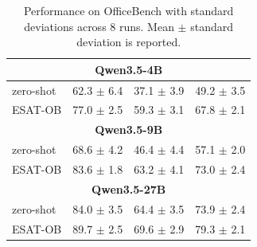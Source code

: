 \begin{table}[H]
{\begin{tabular}{lccc}
\multicolumn{4}{c}{\bf Qwen3.5-4B}\\
\midrule
zero-shot & 62.3 $\pm$ 6.4 & 37.1 $\pm$ 3.9 & 49.2 $\pm$ 3.5 \\
\textsc{ESAT-OB} & 77.0 $\pm$ 2.5 & 59.3 $\pm$ 3.1 & 67.8 $\pm$ 2.1 \\
\midrule

\multicolumn{4}{c}{\bf Qwen3.5-9B}\\
\midrule
zero-shot & 68.6 $\pm$ 4.2 & 46.4 $\pm$ 4.4 & 57.1 $\pm$ 2.0 \\
\textsc{ESAT-OB} & 83.6 $\pm$ 1.8 & 63.2 $\pm$ 4.1 & 73.0 $\pm$ 2.4 \\
\midrule

\multicolumn{4}{c}{\bf Qwen3.5-27B}\\
\midrule
zero-shot & 84.0 $\pm$ 3.5 & 64.4 $\pm$ 3.5 & 73.9 $\pm$ 2.4 \\
\textsc{ESAT-OB} & 89.7 $\pm$  2.5 & 69.6 $\pm$ 2.9 & 79.3 $\pm$ 2.1 \\

\bottomrule
\end{tabular}
}
\caption{Performance on OfficeBench with standard deviations across 8 runs. Mean $\pm$ standard deviation is reported.}
\label{tab:officebench_std}
\end{table}
